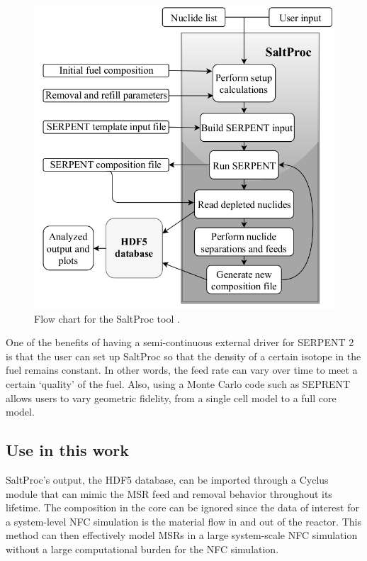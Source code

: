 \begin{figure}[htbp!]
	\begin{center}
		\includegraphics[scale=0.3]{./images/saltproc.png}
	\end{center}
	\caption{Flow chart for the SaltProc tool
		\cite{rykhlevskii_online_2017}.}
	\label{fig:SaltProc}
\end{figure}


One of the benefits of having a semi-continuous external driver for
SERPENT 2 is that the user can set up SaltProc so that the density
of a certain isotope in the fuel remains constant. In other words,
the feed rate can vary over time to meet a certain `quality' of the fuel.
Also, using a Monte Carlo code such as SEPRENT allows users to vary
geometric fidelity, from a single cell model to a full core model.

\subsection{Use in this work}
SaltProc's output, the HDF5 database, can be imported through a Cyclus
module that can mimic the \gls{MSR} feed and removal
behavior throughout its lifetime. The composition in the core can
be ignored since the data of interest for a system-level \gls{NFC} simulation
is the material flow in and out of the reactor. This method can
then effectively model \glspl{MSR} in a large system-scale \gls{NFC}
simulation without a large computational burden for the \gls{NFC} simulation.